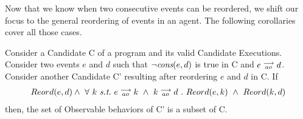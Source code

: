 Now that we know when two consecutive events can be reordered, we shift our focus to the general reordering of events in an agent. 
The following corollaries cover all those cases. 

\begin{corollary}
    \label{CorollReord}
    Consider a Candidate C of a program and its valid Candidate Executions.
    Consider two events $e$ and $d$ such that $\neg \textit{cons}(e,d)$ is true in C and $e\stackrel{\longrightarrow}{_{ao}}d$. 
    Consider another Candidate C' resulting after reordering $e$ and $d$ in C. 
    If
    \begin{align*}
        Reord(e,d) \wedge \ 
        \forall \ k \ \textit{s.t.} \ 
        \reln{e}{ao}{k} \ \wedge \ \reln{k}{ao}{d} \ . \ 
        Reord(e,k) \ \wedge \ Reord(k,d)    
    \end{align*}
    then, the set of Observable behaviors of C' is a subset of C. 
    \label{corol1}
\end{corollary}
    
